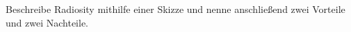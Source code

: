 \documentclass[../../main.tex]{subfiles}
\begin{document}
Beschreibe Radiosity mithilfe einer Skizze und nenne anschließend zwei Vorteile und zwei Nachteile.
\end{document}
